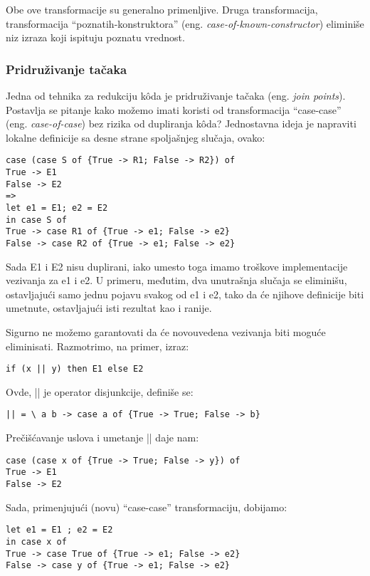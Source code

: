 Obe ove transformacije su generalno primenljive. Druga transformacija, transformacija “poznatih-konstruktora” (eng. \emph{case-of-known-constructor}) eliminiše niz izraza koji ispituju poznatu vrednost.

\subsubsection {Pridruživanje tačaka}
\label{sec:podpodnaslovJoin}

Jedna od tehnika za redukciju k\^{o}da je pridruživanje tačaka (eng. \emph{join points}). Postavlja se pitanje kako možemo imati koristi od transformacija “case-case” (eng. \emph{case-of-case}) bez rizika od dupliranja k\^{o}da? Jednostavna ideja je napraviti lokalne definicije sa desne strane spoljašnjeg slučaja, ovako:
\begin{verbatim}
case (case S of {True -> R1; False -> R2}) of
True -> E1
False -> E2
=>
let e1 = E1; e2 = E2
in case S of
True -> case R1 of {True -> e1; False -> e2}
False -> case R2 of {True -> e1; False -> e2}
\end{verbatim}

Sada E1 i E2 nisu duplirani, iako umesto toga imamo troškove implementacije vezivanja za e1 i e2. U primeru, međutim, dva unutrašnja slučaja se eliminišu, ostavljajući samo jednu pojavu svakog od e1 i e2, tako da će njihove definicije biti umetnute, ostavljajući isti rezultat kao i ranije.

Sigurno ne možemo garantovati da će novouvedena vezivanja biti moguće eliminisati. Razmotrimo, na primer, izraz:
\begin{verbatim}
if (x || y) then E1 else E2
\end{verbatim}
Ovde, || je operator disjunkcije, definiše se:
\begin{verbatim}
|| = \ a b -> case a of {True -> True; False -> b}
\end{verbatim}

Prečišćavanje uslova i umetanje || daje nam:
\begin{verbatim}
case (case x of {True -> True; False -> y}) of
True -> E1
False -> E2
\end{verbatim}

Sada, primenjujući (novu) “case-case” transformaciju, dobijamo:
\begin{verbatim}
let e1 = E1 ; e2 = E2
in case x of
True -> case True of {True -> e1; False -> e2}
False -> case y of {True -> e1; False -> e2}
\end{verbatim}

